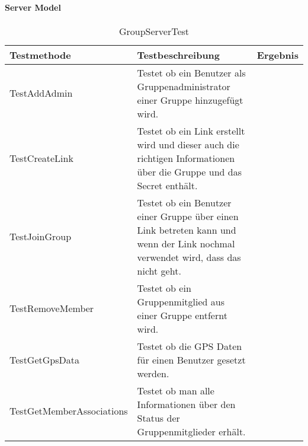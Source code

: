 		\paragraph{Server Model}
		\begin{table}[H]
			{
				\begin{tabular}{|p{}|p{}|>{\centering}p{}|}
					\hline
					Testmethode & Testbeschreibung & Ergebnis\tabularnewline
					\hline
					\hspace{0pt}TestAddAdmin & Testet ob ein Benutzer als Gruppenadministrator einer Gruppe hinzugefügt wird. &	\checkmark\tabularnewline
					\hspace{0pt}TestCreateLink & Testet ob ein Link erstellt wird und dieser auch die richtigen Informationen über die Gruppe und das Secret enthält. &	\checkmark\tabularnewline
					\hspace{0pt}TestJoinGroup & Testet ob ein Benutzer einer Gruppe über einen Link betreten kann und wenn der Link nochmal verwendet wird, dass das nicht geht. &	\checkmark\tabularnewline
					\hspace{0pt}TestRemoveMember & Testet ob ein Gruppenmitglied aus einer Gruppe entfernt wird. &	\checkmark\tabularnewline
					\hspace{0pt}TestGetGpsData & Testet ob die GPS Daten für einen Benutzer gesetzt werden. &	\checkmark\tabularnewline
					\hspace{0pt}TestGetMemberAssociations & Testet ob man alle Informationen über den Status der Gruppenmitglieder erhält. &	\checkmark\tabularnewline
					\hline
				\end{tabular}}
				\caption{GroupServerTest}
			\end{table}
		
